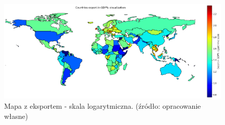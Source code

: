 \documentclass[11pt]{report}
\begin{document}
    \begin{figure}[!htp]
        \centering
        \includegraphics[width=1 \textwidth]{fig/CLUST/export2015.png}
        \caption{Mapa z eksportem - skala logarytmiczna. (źródło: opracowanie własne)}
        \label{fig:clustExport2015_log}
    \end{figure}
\end{document}
